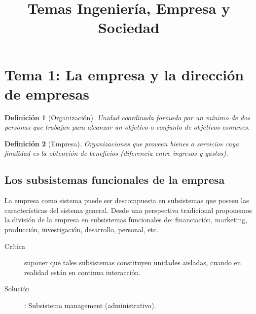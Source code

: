 \documentclass[12pt]{article}
\title{Temas Ingeniería, Empresa y Sociedad}
\author{ }
\theoremstyle{definition_wo_parentheses}
\newtheorem{definicion}{Definición}[section]
\begin{document}
\maketitle

\section{Tema 1: La empresa y la dirección de empresas}
\begin{definicion}[Organización]
	Unidad coordinada formada por un mínimo de dos personas que trabajan para alcanzar un objetivo o conjunto de objetivos comunes.
\end{definicion}

\begin{definicion}[Empresa] Organizaciones que proveen bienes o servicios cuya finalidad es la obtención de beneficios (diferencia entre ingresos y gastos).
\end{definicion}

\subsection{Los subsistemas funcionales de la empresa}
La empresa como sistema puede ser descompuesta en subsistemas que poseen las características del sistema general. Desde una perspectiva tradicional proponemos la división de la empresa en subsistemas funcionales de: financiación, marketing, producción, investigación, desarrollo, personal, etc.
\begin{description}
\item[Crítica] suponer que tales subsistemas constituyen unidades aisladas, cuando en realidad están en continua interacción.
\item[Solución]: Subsistema management (administrativo).
\end{description}
\end{document}
